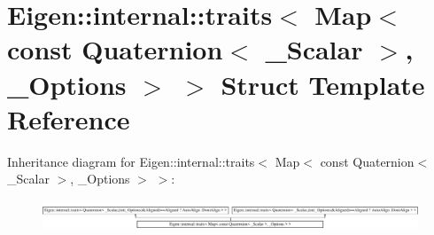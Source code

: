 \hypertarget{struct_eigen_1_1internal_1_1traits_3_01_map_3_01const_01_quaternion_3_01___scalar_01_4_00_01___options_01_4_01_4}{}\section{Eigen\+:\+:internal\+:\+:traits$<$ Map$<$ const Quaternion$<$ \+\_\+\+Scalar $>$, \+\_\+\+Options $>$ $>$ Struct Template Reference}
\label{struct_eigen_1_1internal_1_1traits_3_01_map_3_01const_01_quaternion_3_01___scalar_01_4_00_01___options_01_4_01_4}
Inheritance diagram for Eigen\+:\+:internal\+:\+:traits$<$ Map$<$ const Quaternion$<$ \+\_\+\+Scalar $>$, \+\_\+\+Options $>$ $>$\+:\begin{figure}[H]
\begin{center}
\leavevmode
\includegraphics[height=0.910569cm]{struct_eigen_1_1internal_1_1traits_3_01_map_3_01const_01_quaternion_3_01___scalar_01_4_00_01___options_01_4_01_4}
\end{center}
\end{figure}
